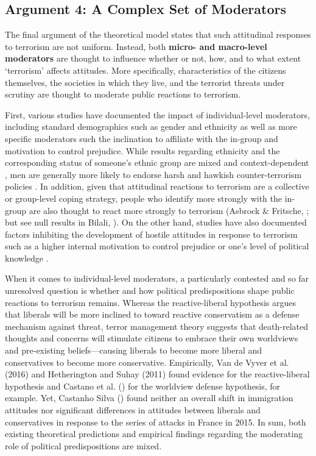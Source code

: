 \newpage
\subsection{Argument 4: A Complex Set of Moderators}
\label{sec:124}
The final argument of the theoretical model states that such attitudinal responses to terrorism are not uniform. Instead, both \textbf{micro- and macro-level moderators} are thought to influence whether or not, how, and to what extent `terrorism' affects attitudes. More specifically, characteristics of the citizens themselves, the societies in which they live, and the terrorist threats under scrutiny are thought to moderate public reactions to terrorism.


First, various studies have documented the impact of individual-level moderators, including standard demographics such as gender and ethnicity as well as more specific moderators such the inclination to affiliate with the in-group and motivation to control prejudice. While results regarding ethnicity and the corresponding status of someone's ethnic group are mixed and context-dependent \citep{Shoshani2016, Lavi2014}, men are generally more likely to endorse harsh and hawkish counter-terrorism policies \citep{Huddy2005, Lindner2018a, Lizotte2017}. In addition, given that attitudinal reactions to terrorism are a collective or group-level coping strategy, people who identify more strongly with the in-group are also thought to react more strongly to terrorism (Asbrock \& Fritsche, \citeyear{Asbrock2013a}; but see null results in Bilali, \citeyear{Bilali2015}). On the other hand, studies have also documented factors inhibiting the development of hostile attitudes in response to terrorism such as a higher internal motivation to control prejudice \citep{Steen-Johnsen2019, Sobolewska2017} or one's level of political knowledge \citep{Carriere2019a}.


When it comes to individual-level moderators, a particularly contested and so far unresolved question is whether and how political predispositions shape public reactions to terrorism remains. Whereas the reactive-liberal hypothesis \citep{Nail2009a} argues that liberals will be more inclined to toward reactive conservatism as a defense mechanism against threat, terror management theory \citep{Pyszczynski2003} suggests that death-related thoughts and concerns will stimulate citizens to embrace their own worldviews and pre-existing beliefs---causing liberals to become more liberal and conservatives to become more conservative. Empirically, Van de Vyver et al. (2016) and Hetherington and Suhay (2011) found evidence for the reactive-liberal hypothesis and Castano et al. (\citeyear{Castano2011}) for the worldview defense hypothesis, for example. Yet, Castanho Silva (\citeyear{Castanhosilva2018}) found neither an overall shift in immigration attitudes nor significant differences in attitudes between liberals and conservatives in response to the series of attacks in France in 2015. In sum, both existing theoretical predictions and empirical findings regarding the moderating role of political predispositions are mixed.


